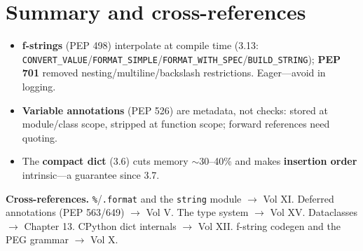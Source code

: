 \section{Summary and cross-references}

\begin{itemize}
  \item \textbf{f-strings} (PEP 498) interpolate at compile time (3.13:
    \texttt{CONVERT\_VALUE}/\texttt{FORMAT\_SIMPLE}/\texttt{FORMAT\_WITH\_SPEC}/\texttt{BUILD\_STRING});
    \textbf{PEP 701} removed nesting/multiline/backslash restrictions. Eager---avoid in logging.
  \item \textbf{Variable annotations} (PEP 526) are metadata, not checks: stored at module/class
    scope, stripped at function scope; forward references need quoting.
  \item The \textbf{compact dict} (3.6) cuts memory $\sim$30--40\% and makes \textbf{insertion
    order} intrinsic---a guarantee since 3.7.
\end{itemize}

\textbf{Cross-references.} \texttt{\%}/\texttt{.format} and the \texttt{string} module $\rightarrow$
Vol XI. Deferred annotations (PEP 563/649) $\rightarrow$ Vol V. The type system $\rightarrow$
Vol XV. Dataclasses $\rightarrow$ Chapter 13. CPython dict internals $\rightarrow$ Vol XII. f-string
codegen and the PEG grammar $\rightarrow$ Vol X.

